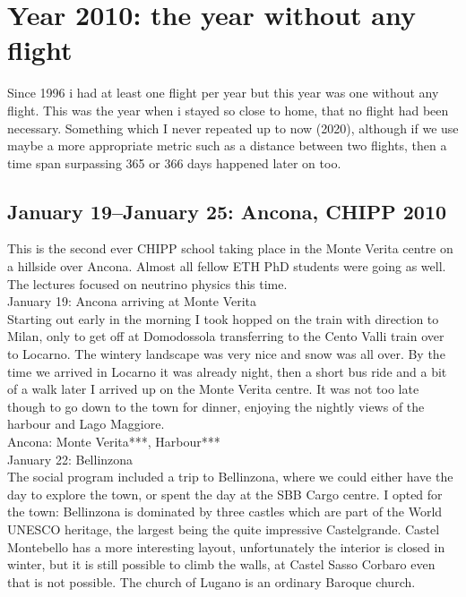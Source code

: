 \chapter{Year 2010: the year without any flight}
\label{2010}

Since 1996 i had at least one flight per year but this year was one without any flight. This was the year when i stayed so close to home, that no flight had been necessary. Something which I never repeated up to now (2020), although if we use maybe a more appropriate metric such as a distance between two flights, then a time span surpassing 365 or 366 days happened later on too.

\section{January 19--January 25: Ancona, CHIPP 2010}
\label{Ancona2010}

This is the second ever CHIPP school taking place in the Monte Verita centre on a hillside over Ancona. Almost all fellow ETH PhD students were going as well. The lectures focused on neutrino physics this time.\\

January 19: Ancona arriving at Monte Verita\\
Starting out early in the morning I took hopped on the train with direction to Milan, only to get off at Domodossola transferring to the Cento Valli train over to Locarno. The wintery landscape was very nice and snow was all over. By the time we arrived in Locarno it was already night, then a short bus ride and a bit of a walk later I arrived up on the Monte Verita centre. It was not too late though to go down to the town for dinner, enjoying the nightly views of the harbour and Lago Maggiore.\\

Ancona: Monte Verita***, Harbour***\\

January 22: Bellinzona\\
The social program included a trip to Bellinzona, where we could either have the day to explore the town, or spent the day at the SBB Cargo centre. I opted for the town: Bellinzona is dominated by three castles which are part of the World UNESCO heritage, the largest being the quite impressive Castelgrande. Castel Montebello has a more interesting layout, unfortunately the interior is closed in winter, but it is still possible to climb the walls, at Castel Sasso Corbaro even that is not possible. The church of Lugano is an ordinary Baroque church.\\

